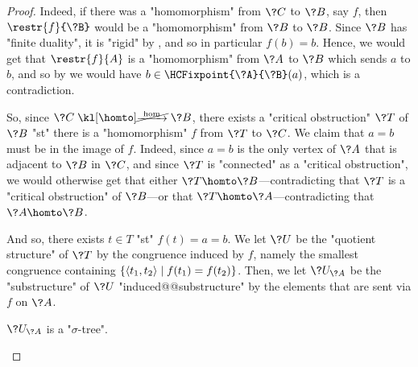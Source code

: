\begin{proof}
	Indeed, if there was a "homomorphism" from $\?C$ to $\?B$, say $f$, then
	$\restr{f}{\?B}$ would be a "homomorphism" from $\?B$ to $\?B$.
	Since $\?B$ has "finite duality", it is "rigid" by , and so in particular $f(b) = b$.
	Hence, we would get that $\restr{f}{A}$ is a "homomorphism" from $\?A$ to $\?B$
	which sends $a$ to $b$, and so by 
	we would have $b \in \HCFixpoint{\?A}{\?B}(a)$, which is a contradiction.

	So, since $\?C \nothomto \?B$, there exists a "critical obstruction" $\?T$ of $\?B$
	"st" there is a "homomorphism" $f$ from $\?T$ to $\?C$. 
	We claim that $a=b$ must be in the image of $f$. Indeed, since $a=b$ is the only vertex
	of $\?A$ that is adjacent to $\?B$ in $\?C$, and since $\?T$ is "connected" as a
	"critical obstruction",
	we would otherwise get that either $\?T \homto \?B$---contradicting that $\?T$ is a "critical obstruction" of $\?B$---or that $\?T \homto \?A$---contradicting that $\?A \homto \?B$.
	
	And so, there exists $t \in T$ "st" $f(t) = a = b$.
	We let $\?U$ be the "quotient structure" of $\?T$ by the congruence induced by $f$,
	namely the smallest congruence containing $\{\langle t_1,t_2\rangle \mid f(t_1) = f(t_2)\}$.
	Then, we let $\?U_{\?A}$ be the "substructure" of $\?U$
	"induced@@substructure" by the elements that are sent via $f$ on $\?A$.

	\begin{claim}
		\AP\label{claim:hyperedge-consistency-uniform-convergence-trees-are-trees}
		$\?U_{\?A}$ is a "$\sigma$-tree".
	\end{claim}


\end{proof}
